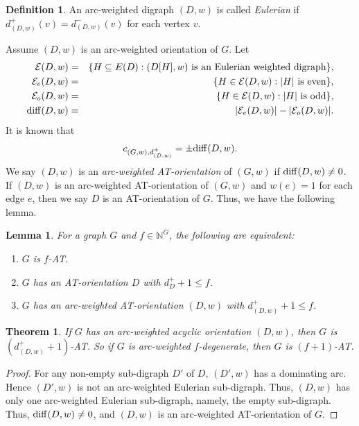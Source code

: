 \documentclass[11pt,a4paper]{article}
\newtheorem{theorem}{Theorem}
\newtheorem{lem}{Lemma}
\theoremstyle{definition}
\newtheorem{definition}{Definition}
\begin{document}
\begin{definition}
     An arc-weighted digraph $(D,w)$ is called {\em Eulerian} if $d^+_{(D,w)}(v) = d_{(D,w)}^-(v)$ for
 each vertex $v$.
\end{definition}
Assume $(D,w)$ is an arc-weighted orientation  of $G$. Let 
\begin{eqnarray*}
    \mathcal{E}(D,w) &=& \{H \subseteq E(D): (D[H],w) \text{ is an Eulerian weighted digraph}\},\\
    \mathcal{E}_e(D,w) &=& \{H \in  \mathcal{E}(D,w): |H| \text{ is even}\},\\
     \mathcal{E}_o(D,w) &=& \{H \in  \mathcal{E}(D,w): |H| \text{ is odd}\},\\
     {\rm diff}(D,w) &=& |\mathcal{E}_e(D,w)|-|\mathcal{E}_o(D,w)|.
\end{eqnarray*}
 It is known \cite{kozik} that 
$$c_{(G,w), d_{(D,w)}^+} = \pm {\rm diff}(D,w).$$
We say $(D,w)$ is an {\em arc-weighted AT-orientation} of $(G,w)$ if ${\rm diff}(D,w) \ne 0$. If $(D,w)$ is an   arc-weighted AT-orientation   of $(G,w)$ and $w(e)=1$ for each edge $e$, then we say $D$ is an AT-orientation of $G$.
Thus, we have the following lemma.
\begin{lem}
    \label{lem-3}
 For a graph $G$ and $f \in \mathbb{N}^G$, the following are equivalent:
    \begin{enumerate}
        \item $G$ is $f$-AT.
        \item $G$ has an   AT-orientation $D$ with   $d_D^+ +1 \le f$.  
        \item $G$ has an arc-weighted AT-orientation $(D,w)$  with $d_{(D,w)}^+ +1 \le f$.
    \end{enumerate}
\end{lem}  



\begin{theorem}
    \label{thm-AT}
    If $G$ has an arc-weighted  acyclic orientation $(D,w)$, then $G$ is $(d_{(D,w)}^++1)$-AT. So if $G$ is arc-weighted   $f$-degenerate, then $G$ is $(f+1)$-AT.
\end{theorem}
\begin{proof}
For any non-empty sub-digraph $D'$ of $D$, $(D', w)$ has a dominating arc. Hence $(D',w)$ is not an arc-weighted  Eulerian sub-digraph.  Thus, $(D,w)$ has only one arc-weighted Eulerian sub-digraph, namely, the empty sub-digraph. 
Thus, ${\rm diff}(D,w)\neq 0$, and  
   $(D,w)$ is an arc-weighted AT-orientation of $G$. 
\end{proof}
\end{document}
